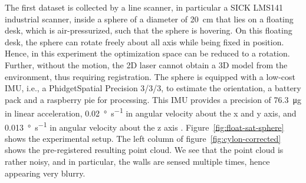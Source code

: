 \documentclass[5p]{elsarticle}
\begin{document}
The first dataset is collected by a line scanner, in particular a SICK LMS141 industrial scanner, inside a sphere of a diameter of \SI{20}{\centi\meter} that lies on a floating desk, which is air-pressurized, such that the sphere is hovering.
On this floating desk, the sphere can rotate freely about all axis while being fixed in position. 
Hence, in this experiment the optimization space can be reduced to a rotation.
Further, without the motion, the 2D laser cannot obtain a 3D model from the environment, thus requiring registration. 
The sphere is equipped with a low-cost IMU, i.e., a PhidgetSpatial Precision 3/3/3, to estimate the orientation, a battery pack and a raspberry pie for processing.
This IMU provides a precision of \SI{76.3}{\micro g} in linear acceleration, \SI{0.02}{\degree\per\second} in angular velocity about the x and y axis, and \SI{0.013}{\degree\per\second} in angular velocity about the z axis \cite{PhidgetSpatial}.  
Figure~\ref{fig:float-sat-sphere} shows the experimental setup. The left column of figure~\ref{fig:cylon-corrected} shows the pre-registered resulting point cloud. 
We see that the point cloud is rather noisy, and in particular, the walls are sensed multiple times, hence appearing very blurry. 
\end{document}
